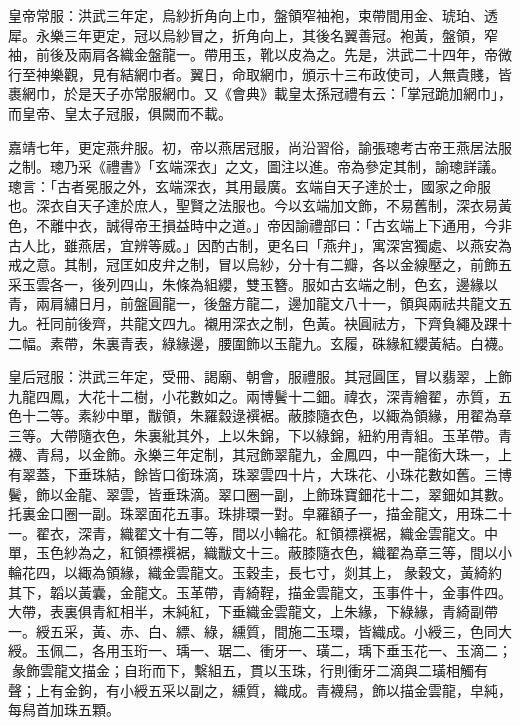 皇帝常服：洪武三年定，烏紗折角向上巾，盤領窄袖袍，束帶間用金、琥珀、透犀。永樂三年更定，冠以烏紗冒之，折角向上，其後名翼善冠。袍黃，盤領，窄袖，前後及兩肩各織金盤龍一。帶用玉，靴以皮為之。先是，洪武二十四年，帝微行至神樂觀，見有結網巾者。翼日，命取網巾，頒示十三布政使司，人無貴賤，皆裹網巾，於是天子亦常服網巾。又《會典》載皇太孫冠禮有云：「掌冠跪加網巾」，而皇帝、皇太子冠服，俱闕而不載。

嘉靖七年，更定燕弁服。初，帝以燕居冠服，尚沿習俗，諭張璁考古帝王燕居法服之制。璁乃采《禮書》「玄端深衣」之文，圖注以進。帝為參定其制，諭璁詳議。璁言：「古者冕服之外，玄端深衣，其用最廣。玄端自天子達於士，國家之命服也。深衣自天子達於庶人，聖賢之法服也。今以玄端加文飾，不易舊制，深衣易黃色，不離中衣，誠得帝王損益時中之道。」帝因諭禮部曰：「古玄端上下通用，今非古人比，雖燕居，宜辨等威。」因酌古制，更名曰「燕弁」，寓深宮獨處、以燕安為戒之意。其制，冠匡如皮弁之制，冒以烏紗，分十有二瓣，各以金線壓之，前飾五采玉雲各一，後列四山，朱條為組纓，雙玉簪。服如古玄端之制，色玄，邊緣以青，兩肩繡日月，前盤圓龍一，後盤方龍二，邊加龍文八十一，領與兩祛共龍文五九。衽同前後齊，共龍文四九。襯用深衣之制，色黃。袂圓祛方，下齊負繩及踝十二幅。素帶，朱裏青表，綠緣邊，腰圍飾以玉龍九。玄履，硃緣紅纓黃結。白襪。

皇后冠服：洪武三年定，受冊、謁廟、朝會，服禮服。其冠圓匡，冒以翡翠，上飾九龍四鳳，大花十二樹，小花數如之。兩博鬢十二鈿。禕衣，深青繪翟，赤質，五色十二等。素紗中單，黻領，朱羅縠逯襈裾。蔽膝隨衣色，以緅為領緣，用翟為章三等。大帶隨衣色，朱裏紕其外，上以朱錦，下以綠錦，紐約用青組。玉革帶。青襪、青舄，以金飾。永樂三年定制，其冠飾翠龍九，金鳳四，中一龍銜大珠一，上有翠蓋，下垂珠結，餘皆口銜珠滴，珠翠雲四十片，大珠花、小珠花數如舊。三博鬢，飾以金龍、翠雲，皆垂珠滴。翠口圈一副，上飾珠寶鈿花十二，翠鈿如其數。托裏金口圈一副。珠翠面花五事。珠排環一對。皁羅額子一，描金龍文，用珠二十一。翟衣，深青，織翟文十有二等，間以小輪花。紅領褾襈裾，織金雲龍文。中單，玉色紗為之，紅領褾襈裾，織黻文十三。蔽膝隨衣色，織翟為章三等，間以小輪花四，以緅為領緣，織金雲龍文。玉穀圭，長七寸，剡其上，彖穀文，黃綺約其下，韜以黃囊，金龍文。玉革帶，青綺鞓，描金雲龍文，玉事件十，金事件四。大帶，表裏俱青紅相半，末純紅，下垂織金雲龍文，上朱緣，下綠緣，青綺副帶一。綬五采，黃、赤、白、縹、綠，纁質，間施二玉環，皆織成。小綬三，色同大綬。玉佩二，各用玉珩一、瑀一、琚二、衝牙一、璜二，瑀下垂玉花一、玉滴二；彖飾雲龍文描金；自珩而下，繫組五，貫以玉珠，行則衝牙二滴與二璜相觸有聲；上有金鉤，有小綬五采以副之，纁質，織成。青襪舄，飾以描金雲龍，皁純，每舄首加珠五顆。

